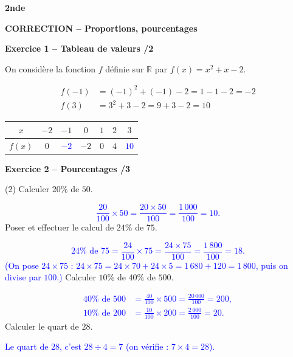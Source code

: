 \documentclass[10pt,a4paper]{article}
\renewcommand{\niveau}{2nde}
\renewcommand{\chapitre}{Proportions, pourcentages}
\renewcommand{\interroversion}[1]{
    \noindent\textbf{\niveau}

    \vspace{-0.5cm}
    \begin{center}
        \textbf{\large CORRECTION -- \chapitre}
    \end{center}

    \vspace{0.1cm}
}
\begin{document}
\newpage


\interroversion{B}

\textbf{Exercice 1 -- Tableau de valeurs \hfill /2}

On considère la fonction \(f\) définie sur \(\mathbb{R}\) par \(f(x)=x^2+x-2\).

\[
\begin{aligned}
f(-1) &= (-1)^2+(-1)-2 = 1-1-2 = -2\\
f(3)  &= 3^2+3-2 = 9+3-2 = 10
\end{aligned}
\]

\begin{center}
    \renewcommand{\arraystretch}{1.5}
    \setlength{\tabcolsep}{0.25cm}
    \begin{tabular}{|*{7}{c|}}
    \hline
    \(x\) & \(-2\) & \(-1\) & \(0\) & \(1\) & \(2\) & \(3\) \\
    \hline
    \(f(x)\) & \(0\) & \textcolor{blue}{\(-2\)} & \(-2\) & \(0\) & \(4\) & \textcolor{blue}{\(10\)} \\
    \hline
    \end{tabular}
\end{center}

\textbf{Exercice 2 -- Pourcentages \hfill /3}

\begin{tasks}(2)
    \task Calculer \(20\%\) de \(50\).

    \textcolor{blue}{
    \[
    \frac{20}{100}\times 50 = \frac{20\times 50}{100} = \frac{1\,000}{100} = 10.
    \]}
    \task Poser et effectuer le calcul de \(24\%\) de \(75\).

    \textcolor{blue}{
    \[
    24\%\text{ de }75 = \frac{24}{100}\times 75 = \frac{24\times 75}{100} = \frac{1\,800}{100} = 18.
    \]
    (On pose \(24\times75\) : \(24\times75=24\times70+24\times5=1\,680+120=1\,800\), puis on divise par \(100\).)}
    \task Calculer \(10\%\) de \(40\%\) de \(500\).

    \textcolor{blue}{
    \[
    \begin{aligned}
    40\%\text{ de }500 &=\frac{40}{100}\times500=\frac{20\,000}{100}=200,\\
    10\%\text{ de }200 &=\frac{10}{100}\times200=\frac{2\,000}{100}=20.
    \end{aligned}
    \]}
    \task Calculer le quart de \(28\).

    \textcolor{blue}{Le quart de \(28\), c'est \(28\div4=7\) (on vérifie : \(7\times4=28\)).}
\end{tasks}
\end{document}
